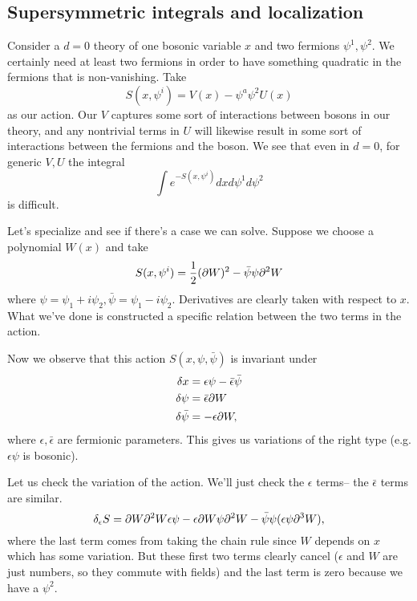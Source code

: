 \subsection*{Supersymmetric integrals and localization} Consider a $d=0$ theory of one bosonic variable $x$ and two fermions $\psi^1,\psi^2$. We certainly need at least two fermions in order to have something quadratic in the fermions that is non-vanishing. Take
\begin{equation}
    S(x,\psi^i)=V(x) - \psi^a \psi^2 U(x)
\end{equation}
as our action.
Our $V$ captures some sort of interactions between bosons in our theory, and any nontrivial terms in $U$ will likewise result in some sort of interactions between the fermions and the boson. We see that even in $d=0$, for generic $V,U$ the integral
\begin{equation*}
    \int e^{-S(x,\psi^i)}dx d\psi^1 d\psi^2
\end{equation*}
is difficult.

Let's specialize and see if there's a case we can solve. Suppose we choose a polynomial $W(x)$ and take
\begin{equation}
    S(x,\psi^i)=\frac{1}{2}(\partial W)^2 - \bar \psi \psi \partial^2 W
\end{equation}
where $\psi=\psi_1 +i \psi_2, \bar \psi= \psi_1 -i\psi_2$. Derivatives are clearly taken with respect to $x$. What we've done is constructed a specific relation between the two terms in the action.

Now we observe that this action $S(x,\psi,\bar \psi)$ is invariant under
\begin{align*}
    \delta x &= \epsilon \psi - \bar \epsilon \bar \psi\\
    \delta \psi &= \bar \epsilon \partial W\\
    \delta \bar \psi &= -\epsilon \partial W,
\end{align*}
where $\epsilon,\bar \epsilon$ are fermionic parameters. This gives us variations of the right type (e.g. $\epsilon \psi$ is bosonic).

Let us check the variation of the action. We'll just check the $\epsilon$ terms-- the $\bar \epsilon$ terms are similar.
\begin{equation*}
    \delta_\epsilon S= \partial W \partial^2 W \epsilon \psi - \epsilon \partial W \psi \partial^2 W - \bar \psi \psi (\epsilon \psi \partial^3 W),
\end{equation*}
where the last term comes from taking the chain rule since $W$ depends on $x$ which has some variation. But these first two terms clearly cancel ($\epsilon$ and $W$ are just numbers, so they commute with fields) and the last term is zero because we have a $\psi^2$.

